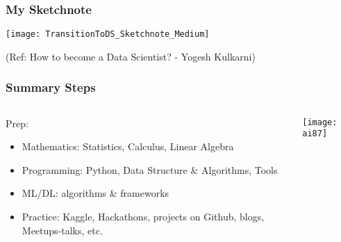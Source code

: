 \begin{frame}[fragile]\frametitle{My Sketchnote}
	
	\begin{center}
	\texttt{[image: TransitionToDS\_Sketchnote\_Medium]}
	\end{center}
{\tiny (Ref: How to become a Data Scientist? - Yogesh Kulkarni)}
\end{frame}

\begin{frame}[fragile]\frametitle{Summary Steps}

\begin{columns}
    \begin{column}[T]{0.6\linewidth}

Prep:
      \begin{itemize}
			\item Mathematics: Statistics, Calculus, Linear Algebra
			\item Programming: Python, Data Structure \& Algorithms, Tools
			\item ML/DL: algorithms \& frameworks
			\item Practice: Kaggle, Hackathons, projects on Github, blogs, Meetups-talks, etc.
			\end{itemize}


    \end{column}
    \begin{column}[T]{0.4\linewidth}

			\begin{center}
			\texttt{[image: ai87]}
			\end{center}
			
    \end{column}
  \end{columns}
  
  

			

			
\end{frame}



